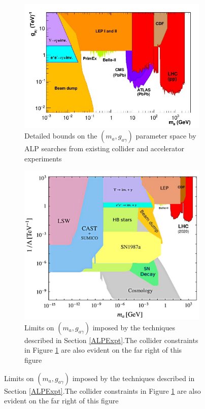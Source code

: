 \begin{figure}[H]
    \begin{subfigure}{0.5\textwidth}
    \includegraphics[scale = 0.8]{ALPColliderConstraints.jpg}
    \caption{Detailed bounds on the $(m_{a}, g_{a\gamma})$ parameter space by ALP searches from existing collider and accelerator experiments}
    \label{ALPColliderConstraints}
    \end{subfigure}
    \hfill
    \begin{subfigure}{0.4\textwidth}
        \includegraphics[scale = 0.4]{ALPExperimentalAndColliderConstraints.jpg}
        \caption{Limits on $(m_{a},g_{a\gamma})$ imposed by the techniques described in Section \ref{ALPExpt}.The collider constraints in Figure \ref{ALPColliderConstraints} are also evident on the far right of this figure}
        \label{ALPExperimentalAndColliderConstraints}
    \end{subfigure}
    \hfill
\end{figure}
